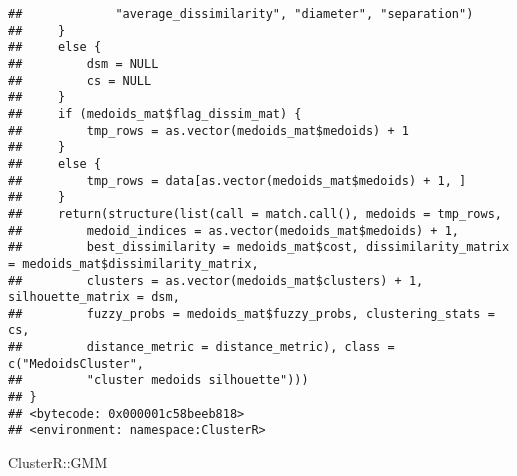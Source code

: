 \documentclass[
]{article}
\newenvironment{Shaded}{\begin{snugshade}}{\end{snugshade}}
\newcommand{\NormalTok}[1]{#1}
\newcommand{\SpecialCharTok}[1]{\textcolor[rgb]{0.00,0.00,0.00}{#1}}
\begin{document}
\begin{verbatim}
##             "average_dissimilarity", "diameter", "separation")
##     }
##     else {
##         dsm = NULL
##         cs = NULL
##     }
##     if (medoids_mat$flag_dissim_mat) {
##         tmp_rows = as.vector(medoids_mat$medoids) + 1
##     }
##     else {
##         tmp_rows = data[as.vector(medoids_mat$medoids) + 1, ]
##     }
##     return(structure(list(call = match.call(), medoids = tmp_rows, 
##         medoid_indices = as.vector(medoids_mat$medoids) + 1, 
##         best_dissimilarity = medoids_mat$cost, dissimilarity_matrix = medoids_mat$dissimilarity_matrix, 
##         clusters = as.vector(medoids_mat$clusters) + 1, silhouette_matrix = dsm, 
##         fuzzy_probs = medoids_mat$fuzzy_probs, clustering_stats = cs, 
##         distance_metric = distance_metric), class = c("MedoidsCluster", 
##         "cluster medoids silhouette")))
## }
## <bytecode: 0x000001c58beeb818>
## <environment: namespace:ClusterR>
\end{verbatim}

\begin{Shaded}
\begin{Highlighting}[]
\NormalTok{ClusterR}\SpecialCharTok{::}\NormalTok{GMM}
\end{Highlighting}
\end{Shaded}
\end{document}
